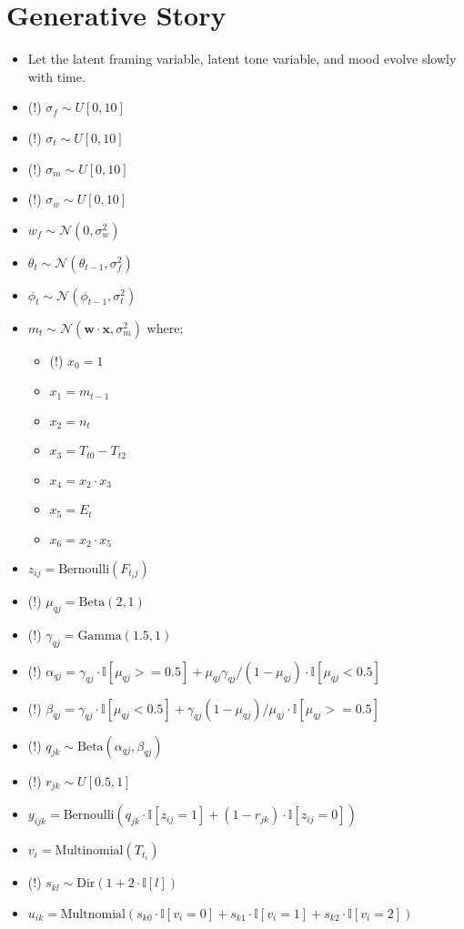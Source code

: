 \documentclass[11pt]{article}
\theoremstyle{plain}
\theoremstyle{definition}
\begin{document}
\section{Generative Story}

\begin{itemize}
\item Let the latent framing variable, latent tone variable, and mood evolve slowly with time.
\item (!) $\sigma_f \sim U[0, 10]$
\item (!) $\sigma_t \sim U[0, 10]$
\item (!) $\sigma_m \sim U[0, 10]$
\item (!) $\sigma_w \sim U[0, 10]$
\item $w_f \sim \mathcal{N}(0, \sigma_w^2)$
\item $\theta_t \sim \mathcal{N}(\theta_{t-1}, \sigma_f^2)$
\item $\phi_t \sim \mathcal{N}(\phi_{t-1}, \sigma_t^2)$
\item $m_t \sim \mathcal{N}(\mathbf{w} \cdot \mathbf{x}, \sigma_m^2)$ where:
\begin{itemize}
\item (!) $x_0 = 1$
\item $x_1 = m_{t-1}$
\item $x_2 = n_t$
\item $x_3 = T_{t0} - T_{t2}$
\item $x_4 = x_2 \cdot x_3$
\item $x_5 = E_t$
\item $x_6 = x_2 \cdot x_5$
\end{itemize}
\item $z_{ij} = \textrm{Bernoulli}(F_{t_i j})$
\item (!) $\mu_{qj} = \textrm{Beta}(2,1)$
\item (!) $\gamma_{qj} = \textrm{Gamma}(1.5,1)$
\item (!) $\alpha_{qj} = \gamma_{qj} \cdot \mathbb{I}[\mu_{qj} >= 0.5] + \mu_{qj} \gamma_{qj} / (1 - \mu_{qj}) \cdot \mathbb{I}[\mu_{qj} < 0.5]$
\item (!) $\beta_{qj} = \gamma_{qj} \cdot \mathbb{I}[\mu_{qj} < 0.5] + \gamma_{qj} (1 - \mu_{qj} ) / \mu_{qj} \cdot \mathbb{I}[\mu_{qj} >= 0.5]$
\item (!) $q_{jk} \sim \textrm{Beta}(\alpha_{qj}, \beta_{qj})$
\item (!) $r_{jk} \sim U[0.5, 1]$
\item $y_{ijk} = \textrm{Bernoulli}\left( q_{jk} \cdot \mathbb{I}[{z_{ij}}=1] + (1-r_{jk}) \cdot \mathbb{I}[z_{ij} = 0]\right)$
\item $v_{i} = \textrm{Multinomial}(T_{t_i})$
\item (!) $s_{kl} \sim \textrm{Dir}(1 + 2 \cdot \mathbb{I}[l])$
\item $u_{ik} = \textrm{Multnomial}(s_{k0} \cdot \mathbb{I}[v_i = 0] + s_{k1} \cdot \mathbb{I}[v_i = 1] + s_{k2} \cdot \mathbb{I}[v_i = 2]) $

\end{itemize}
\end{document}
